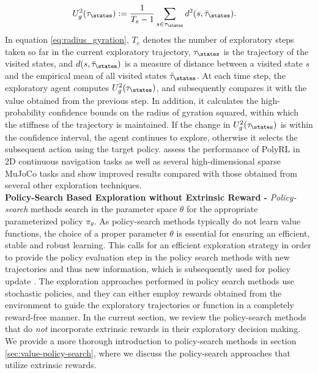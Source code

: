 \begin{align}
    U_g^2(\tau_\states) &:= \frac{1}{T_e-1} \sum_{s \in \tau_\states} d^2(s,\Bar{\tau}_\states).\label{eq:radius_gyration}
\end{align}
In equation \ref{eq:radius_gyration}, $T_e$ denotes the number of exploratory steps taken so far in the current exploratory trajectory, $\tau_\states$ is the trajectory of the visited states, and $d(s,\bar{\tau}_\states)$ is a measure of distance between a visited state $s$ and the empirical mean of all visited states $\Bar{\tau}_\states$. At each time step, the exploratory agent computes  $U_g^2(\tau_\states)$, and subsequently compares it with the value obtained from the previous step. In addition, it calculates the high-probability confidence bounds on the radius of gyration squared, within which the stiffness of the trajectory is maintained. If the change in $U_g^2(\tau_\states)$ is within the confidence interval, the agent continues to explore, otherwise it selects the subsequent action using the target policy.  assess the performance of PolyRL in 2D continuous navigation tasks as well as several high-dimensional sparse MuJoCo tasks and show improved results compared with those obtained from several other exploration techniques. \\
\textbf{Policy-Search Based Exploration without Extrinsic Reward -}
\label{sec:pure-policy-seach}\emph{Policy-search} methods search in the parameter space $\theta$ for the appropriate parameterized policy $\pi_\theta$. As policy-search methods typically do not learn value functions, the choice of a proper parameter $\theta$ is essential for ensuring an efficient, stable and robust learning. This calls for an efficient exploration strategy in order to provide the policy evaluation step in the policy search methods with new trajectories and thus new information, which is subsequently used for policy update . The exploration approaches performed in policy search methods use stochastic policies, and they can either employ rewards obtained from the environment to guide the exploratory trajectories or function in a completely reward-free manner. In the current section, we review the policy-search methods that do \emph{not} incorporate extrinsic rewards in their exploratory decision making. We provide a more thorough introduction to policy-search methods in section \ref{sec:value-policy-search}, where we discuss the policy-search approaches that utilize extrinsic rewards.
